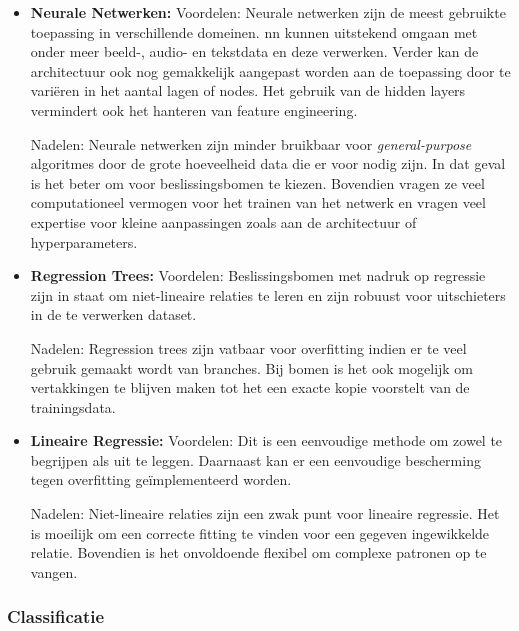 	\begin{itemize}
		\item \textbf{Neurale Netwerken:}
			\subitem Voordelen: Neurale netwerken zijn de meest gebruikte toepassing in verschillende domeinen. \gls{nn} kunnen uitstekend omgaan met onder meer beeld-, audio- en tekstdata en deze verwerken. Verder kan de architectuur ook nog gemakkelijk aangepast worden aan de toepassing door te vari\"eren in het aantal lagen of nodes. Het gebruik van de hidden layers vermindert ook het hanteren van feature engineering. 
			
			\subitem Nadelen: Neurale netwerken zijn minder bruikbaar voor \textit{general-purpose} algoritmes door de grote hoeveelheid data die er voor nodig zijn. In dat geval is het beter om voor beslissingsbomen te kiezen. Bovendien vragen ze veel computationeel vermogen voor het trainen van het netwerk en vragen veel expertise voor kleine aanpassingen zoals aan de architectuur of hyperparameters. 
			
		\item \textbf{Regression Trees:}
			\subitem Voordelen: Beslissingsbomen met nadruk op regressie zijn in staat om niet-lineaire relaties te leren en zijn robuust voor uitschieters in de te verwerken dataset.
			
			\subitem Nadelen: Regression trees zijn vatbaar voor overfitting indien er te veel gebruik gemaakt wordt van branches. Bij bomen is het ook mogelijk om vertakkingen te blijven maken tot het een exacte kopie voorstelt van de trainingsdata.
			
		\item \textbf{Lineaire Regressie:}
			\subitem Voordelen: Dit is een eenvoudige methode om zowel te begrijpen als uit te leggen. Daarnaast kan er een eenvoudige bescherming tegen overfitting ge\"implementeerd worden.
			
			\subitem Nadelen: Niet-lineaire relaties zijn een zwak punt voor lineaire regressie. Het is moeilijk om een correcte fitting te vinden voor een gegeven ingewikkelde relatie. Bovendien is het onvoldoende flexibel om complexe patronen op te vangen.

	\end{itemize}

	\subsubsection{Classificatie}
	
